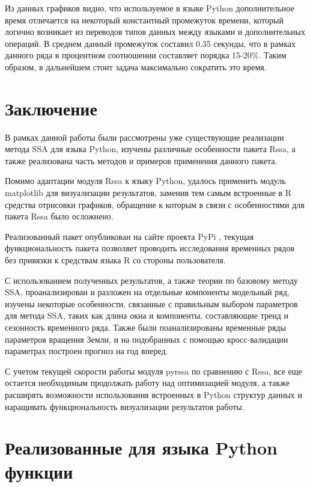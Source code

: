 \documentclass[specialist,
			   substylefile = spbu_report.rtx,
			   subf,href,colorlinks=true, 12pt]{disser}
\begin{document}
Из данных графиков видно, что используемое в языке Python дополнительное время отличается на некоторый константный промежуток времени, который логично возникает из переводов типов данных между языками и дополнительных операций. В среднем данный промежуток составил 0.35 секунды, что в рамках данного ряда в процентном соотношении составляет порядка 15-20\%. Таким образом, в дальнейшем стоит задача максимально сократить это время.

\chapter{Заключение}

В рамках данной работы были рассмотрены уже существующие реализации метода SSA для языка Python, изучены различные особенности пакета Rssa, а также реализована часть методов и примеров применения данного пакета.

Помимо адаптации модуля Rssa к языку Python, удалось применить модуль matplotlib для визуализации результатов, заменив тем самым встроенные в R средства отрисовки графиков, обращение к которым в связи с особенностями для пакета Rssa было осложнено.

Реализованный пакет опубликован на сайте проекта PyPi \cite{pyrssa-lib}, текущая функциональность пакета позволяет проводить исследования временных рядов без привязки к средствам языка R со стороны пользователя.

С использованием полученных результатов, а также теории по базовому методу SSA, проанализирован и разложен на отдельные компоненты модельный ряд, изучены некоторые особенности, связанные с правильным выбором параметров для метода SSA, таких как длина окна и компоненты, составляющие тренд и сезонность временного ряда. Также были поанализированы временные ряды параметров вращения Земли, и на подобранных с помощью кросс-валидации параметрах построен прогноз на год вперед.

С учетом текущей скорости работы модуля pyrssa по сравнению с Rssa, все еще остается необходимым продолжать работу над оптимизацией модуля, а также расширять возможности использования встроенных в Python структур данных и наращивать функциональность визуализации результатов работы.

\printbibliography
{}

\makeatletter

\appendix

\chapter{Реализованные для языка Python функции}
\end{document}
